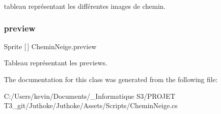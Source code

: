 tableau représentant les différentes images de chemin. \mbox{\label{class_chemin_neige_a6819770f9927f3a012ed332673330ddb}} 
\subsubsection{\texorpdfstring{preview}{preview}}
{\footnotesize\ttfamily Sprite \mbox{[}$\,$\mbox{]} Chemin\+Neige.\+preview\hspace{0.3cm}{\ttfamily [private]}}

Tableau représentant les previews. 

The documentation for this class was generated from the following file\+:\begin{DoxyCompactItemize}
\item 
C\+:/\+Users/kevin/\+Documents/\+\_\+\+Informatique S3/\+P\+R\+O\+J\+E\+T T3\+\_\+git/\+Juthoke/\+Juthoke/\+Assets/\+Scripts/Chemin\+Neige.\+cs\end{DoxyCompactItemize}

